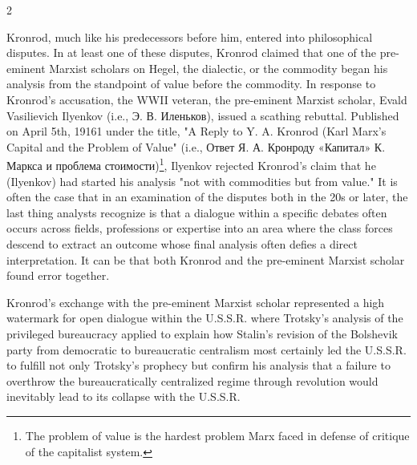 \documentclass[10pt,a4paper,twoside]{article} %
\begin{document}
\begin{multicols}{2}
{\newline \indent Kronrod, much like his predecessors before him, entered into philosophical disputes. In at least one of these disputes, Kronrod claimed that one of the pre-eminent Marxist scholars on Hegel, the dialectic, or the commodity began his analysis from the standpoint of value before the commodity. In response to Kronrod’s accusation, the WWII veteran, the pre-eminent Marxist scholar, Evald Vasilievich Ilyenkov (i.e., \textrussian{Э. В. Иленьков}),  issued a scathing rebuttal. Published on April 5th, 19161 under the title, "A Reply to Y. A. Kronrod (Karl Marx's Capital and the Problem of Value" (i.e., \textrussian{Ответ Я. А. Кронроду «Капитал» К. Маркса и проблема стоимости})\footnote{The problem of value is the hardest problem Marx faced in defense of critique of the capitalist system.}, Ilyenkov rejected Kronrod's claim that he (Ilyenkov) had started his analysis "not with commodities but from value." \newline \indent It is often the case that in an examination of the disputes both in the 20s or later, the last thing analysts recognize is that a dialogue within a specific debates often occurs across fields, professions or expertise into an area where the class forces descend to extract an outcome whose final analysis often defies a direct interpretation. It can be that both Kronrod and the pre-eminent Marxist scholar found error together. 

\newline \indent Kronrod’s exchange with the pre-eminent Marxist scholar represented a high watermark for open dialogue within the U.S.S.R. where Trotsky’s analysis of the privileged bureaucracy applied to explain how Stalin’s revision of the Bolshevik party from democratic to bureaucratic centralism most certainly led the U.S.S.R. to fulfill not only Trotsky’s prophecy but confirm his analysis that a failure to overthrow the bureaucratically centralized regime through revolution would inevitably lead to its collapse with the U.S.S.R.  
}


\end{multicols}
\end{document}
